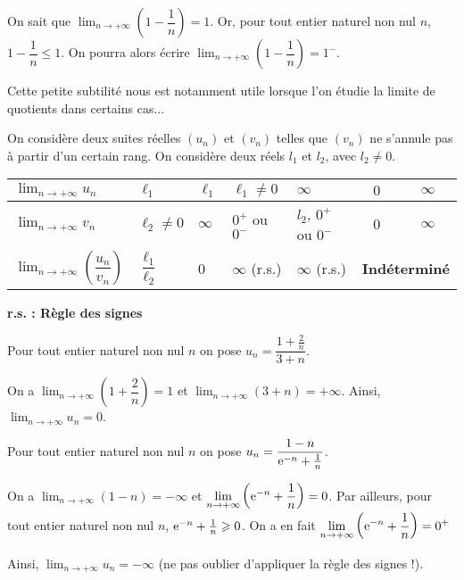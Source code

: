 \documentclass[11pt,fleqn]{book} %
\begin{document}
\begin{example}On sait que $\displaystyle\lim_{n \to + \infty}\left(1-\dfrac{1}{n}\right)=1$. Or, pour tout entier naturel non nul $n$, $1-\dfrac{1}{n}\leqslant 1$. On pourra alors écrire $\displaystyle\lim_{n \to + \infty}\left(1-\dfrac{1}{n}\right)=1^-$.\end{example}

Cette petite subtilité nous est notamment utile lorsque l'on étudie la limite de quotients dans certains cas...


\begin{proposition}On considère deux suites réelles $(u_n)$ et $(v_n)$ telles que $(v_n)$ ne s'annule pas à partir d'un certain rang. On considère deux réels $l_1$ et $l_2$, avec $l_2 \neq 0$. 
\vskip10pt
\begin{tabularx}{\linewidth}{|l|X|X|X|X|c|c|}
\hline
$\displaystyle \lim_{n \to +\infty} u_n$ & $\ell_1 $ & $\ell_1$ & $\ell_1 \neq 0$ & $\infty$  & $0$ & $\infty$\\
\hline
$\displaystyle \lim_{n \to +\infty} v_n$ & $\ell_2 \neq 0$ & $\infty$ &  $0^+$ ou $0^-$ &  $l_2$, $0^+$ ou $0^-$ & $0$ & $\infty$ \\
\hline
$\displaystyle \lim_{n \to +\infty} \left(\dfrac{u_n}{ v_n}\right)$ & $\dfrac{\ell_1}{\ell_2}$ & 0 & $\infty$  (r.s.)  & $\infty$ (r.s.) & \multicolumn{2}{|c|}{\textbf{Indéterminé}} \\
\hline\end{tabularx}


\begin{center}
 \textbf{r.s. : Règle des signes}\\
 \end{center} 
 \vspace{-1cm}\end{proposition}
 
\begin{example} Pour tout entier naturel non nul $n$ on pose $u_n=\dfrac{1+\frac{2}{n}}{3+n}$.

On a  $\displaystyle \lim_{n \to +\infty} \left(1+\dfrac{2}{n}\right)=1$ et $\displaystyle \lim_{n \to +\infty} (3+n) = +\infty$. Ainsi, $\displaystyle \lim_{n \to +\infty} u_n = 0$.\end{example}


\begin{example} Pour tout entier naturel non nul $n$ on pose $u_n=\dfrac{1-n}{\mathrm{e}^{-n}+\frac{1}{n}}$.

On a  $\displaystyle \lim_{n \to +\infty} \left(1-n\right)=-\infty$ et $\displaystyle \lim_{n \to +\infty}\left(\mathrm{e}^{-n}+\frac{1}{n}\right) = 0$. Par ailleurs, pour tout entier naturel non nul $n$, $\mathrm{e}^{-n}+\frac{1}{n} \geqslant 0$. On a en fait $\displaystyle \lim_{n \to +\infty}\left(\mathrm{e}^{-n}+\frac{1}{n}\right) = 0^+$

Ainsi, $\displaystyle \lim_{n \to +\infty} u_n = -\infty$ (ne pas oublier d'appliquer la règle des signes !).\end{example}
\end{document}
